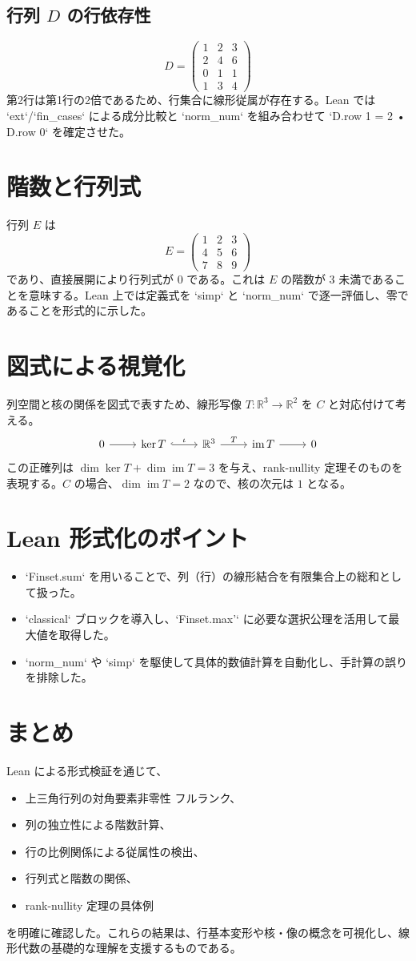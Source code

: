 \documentclass[lualatex]{ltjsarticle}
\theoremstyle{definition}
\theoremstyle{remark}
\begin{document}
\subsection{行列 $D$ の行依存性}
\[
D = \begin{pmatrix}
1 & 2 & 3 \\
2 & 4 & 6 \\
0 & 1 & 1 \\
1 & 3 & 4
\end{pmatrix}
\]
第2行は第1行の2倍であるため、行集合に線形従属が存在する。Lean では `ext`/`fin_cases` による成分比較と `norm_num` を組み合わせて `D.row 1 = 2 • D.row 0` を確定させた。

\section{階数と行列式}
行列 $E$ は
\[
E = \begin{pmatrix}
1 & 2 & 3 \\
4 & 5 & 6 \\
7 & 8 & 9
\end{pmatrix}
\]
であり、直接展開により行列式が $0$ である。これは $E$ の階数が 3 未満であることを意味する。Lean 上では定義式を `simp` と `norm_num` で逐一評価し、零であることを形式的に示した。

\section{図式による視覚化}
列空間と核の関係を図式で表すため、線形写像 $T : \mathbb{R}^3 \to \mathbb{R}^2$ を $C$ と対応付けて考える。
\[
\begin{tikzcd}
0 \arrow[r] & \ker T \arrow[r, hook, "\iota"] & \mathbb{R}^3 \arrow[r, "T"] & \operatorname{im} T \arrow[r] & 0
\end{tikzcd}
\]
この正確列は $\dim \ker T + \dim \operatorname{im} T = 3$ を与え、rank-nullity 定理そのものを表現する。$C$ の場合、$\dim \operatorname{im} T = 2$ なので、核の次元は $1$ となる。

\section{Lean 形式化のポイント}
\begin{itemize}
  \item `Finset.sum` を用いることで、列（行）の線形結合を有限集合上の総和として扱った。
  \item `classical` ブロックを導入し、`Finset.max'` に必要な選択公理を活用して最大値を取得した。
  \item `norm_num` や `simp` を駆使して具体的数値計算を自動化し、手計算の誤りを排除した。
\end{itemize}

\section{まとめ}
Lean による形式検証を通じて、
\begin{itemize}
  \item 上三角行列の対角要素非零性 \Rightarrow フルランク、
  \item 列の独立性による階数計算、
  \item 行の比例関係による従属性の検出、
  \item 行列式と階数の関係、
  \item rank-nullity 定理の具体例
\end{itemize}
を明確に確認した。これらの結果は、行基本変形や核・像の概念を可視化し、線形代数の基礎的な理解を支援するものである。
\end{document}
